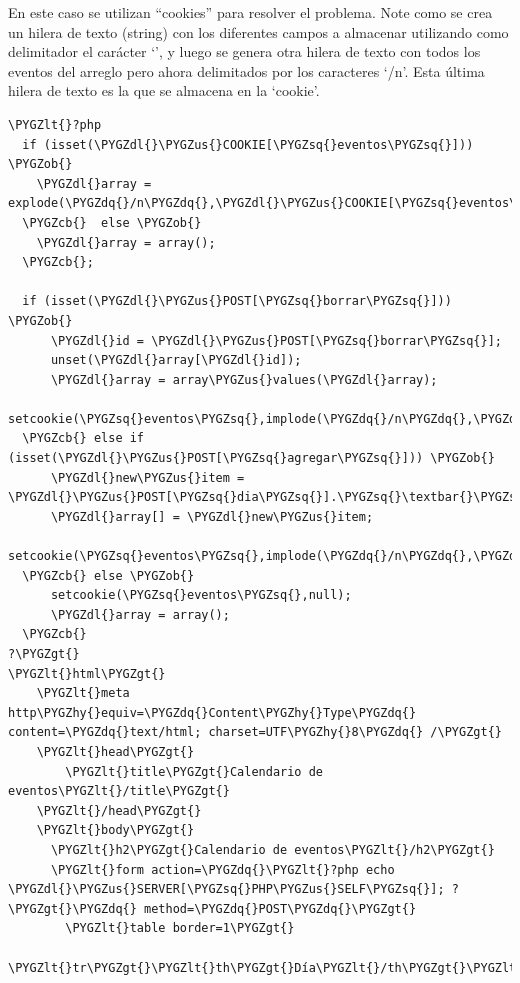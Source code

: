 \documentclass[a5paper,10pt,spanish]{sphinxmanual}
\def\PYGZus{\char`\_}
\def\PYGZob{\char`\{}
\def\PYGZcb{\char`\}}
\def\PYGZlt{\char`\<}
\def\PYGZgt{\char`\>}
\def\PYGZdl{\char`\$}
\def\PYGZhy{\char`\-}
\def\PYGZsq{\char`\'}
\def\PYGZdq{\char`\"}
\begin{document}
En este caso se utilizan ``cookies'' para resolver el problema. Note como
se crea un hilera de texto (string) con los diferentes campos a
almacenar utilizando como delimitador el carácter `\textbar{}', y luego se
genera otra hilera de texto con todos los eventos del arreglo pero ahora
delimitados por los caracteres `/n'. Esta última hilera de texto es la
que se almacena en la `cookie'.

\begin{Verbatim}[commandchars=\\\{\}]
\PYGZlt{}?php
  if (isset(\PYGZdl{}\PYGZus{}COOKIE[\PYGZsq{}eventos\PYGZsq{}])) \PYGZob{}
    \PYGZdl{}array = explode(\PYGZdq{}/n\PYGZdq{},\PYGZdl{}\PYGZus{}COOKIE[\PYGZsq{}eventos\PYGZsq{}]);
  \PYGZcb{}  else \PYGZob{}
    \PYGZdl{}array = array();
  \PYGZcb{};

  if (isset(\PYGZdl{}\PYGZus{}POST[\PYGZsq{}borrar\PYGZsq{}])) \PYGZob{}
      \PYGZdl{}id = \PYGZdl{}\PYGZus{}POST[\PYGZsq{}borrar\PYGZsq{}];
      unset(\PYGZdl{}array[\PYGZdl{}id]);
      \PYGZdl{}array = array\PYGZus{}values(\PYGZdl{}array);
      setcookie(\PYGZsq{}eventos\PYGZsq{},implode(\PYGZdq{}/n\PYGZdq{},\PYGZdl{}array));
  \PYGZcb{} else if (isset(\PYGZdl{}\PYGZus{}POST[\PYGZsq{}agregar\PYGZsq{}])) \PYGZob{}
      \PYGZdl{}new\PYGZus{}item = \PYGZdl{}\PYGZus{}POST[\PYGZsq{}dia\PYGZsq{}].\PYGZsq{}\textbar{}\PYGZsq{}.\PYGZdl{}\PYGZus{}POST[\PYGZsq{}hora\PYGZsq{}].\PYGZsq{}\textbar{}\PYGZsq{}.\PYGZdl{}\PYGZus{}POST[\PYGZsq{}evento\PYGZsq{}];
      \PYGZdl{}array[] = \PYGZdl{}new\PYGZus{}item;
      setcookie(\PYGZsq{}eventos\PYGZsq{},implode(\PYGZdq{}/n\PYGZdq{},\PYGZdl{}array));
  \PYGZcb{} else \PYGZob{}
      setcookie(\PYGZsq{}eventos\PYGZsq{},null);
      \PYGZdl{}array = array();
  \PYGZcb{}
?\PYGZgt{}
\PYGZlt{}html\PYGZgt{}
    \PYGZlt{}meta http\PYGZhy{}equiv=\PYGZdq{}Content\PYGZhy{}Type\PYGZdq{} content=\PYGZdq{}text/html; charset=UTF\PYGZhy{}8\PYGZdq{} /\PYGZgt{}
    \PYGZlt{}head\PYGZgt{}
        \PYGZlt{}title\PYGZgt{}Calendario de eventos\PYGZlt{}/title\PYGZgt{}
    \PYGZlt{}/head\PYGZgt{}
    \PYGZlt{}body\PYGZgt{}
      \PYGZlt{}h2\PYGZgt{}Calendario de eventos\PYGZlt{}/h2\PYGZgt{}
      \PYGZlt{}form action=\PYGZdq{}\PYGZlt{}?php echo \PYGZdl{}\PYGZus{}SERVER[\PYGZsq{}PHP\PYGZus{}SELF\PYGZsq{}]; ?\PYGZgt{}\PYGZdq{} method=\PYGZdq{}POST\PYGZdq{}\PYGZgt{}
        \PYGZlt{}table border=1\PYGZgt{}
            \PYGZlt{}tr\PYGZgt{}\PYGZlt{}th\PYGZgt{}Día\PYGZlt{}/th\PYGZgt{}\PYGZlt{}th\PYGZgt{}Hora\PYGZlt{}/th\PYGZgt{}\PYGZlt{}th\PYGZgt{}Evento\PYGZlt{}/th\PYGZgt{}\PYGZlt{}th\PYGZgt{}Operación\PYGZlt{}/th\PYGZgt{}\PYGZlt{}/tr\PYGZgt{}

\end{Verbatim}
\end{document}

